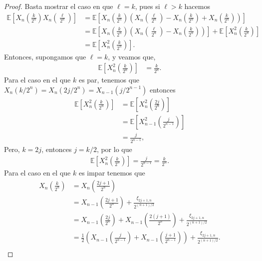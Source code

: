 \begin{proof}
Basta mostrar el caso en que $\ell = k$, pues si $\ell > k$ hacemos
	\begin{align*}
		\mathbb{E} \left[ X_n \left( \frac{k}{2^n} \right) X_n \left( \frac{\ell}{2^n} \right) \right] & = \mathbb{E} \left[ X_n \left( \frac{k}{2^n} \right) \left( X_n \left( \frac{\ell}{2^n} \right)  - X_n \left( \frac{k}{2^n} \right) + X_n \left( \frac{k}{2^n} \right) \right) \right] \\
        & = \mathbb{E} \left[ X_n \left( \frac{k}{2^n} \right) \left( X_n \left( \frac{\ell}{2^n} \right)  - X_n \left( \frac{k}{2^n} \right) \right) \right] + \mathbb{E} \left[ X^2_n \left( \frac{k}{2^n} \right) \right] \\
        & = \mathbb{E} \left[ X^2_n \left( \frac{k}{2^n} \right) \right].
	\end{align*}
Entonces, supongamos que $\ell = k$, y veamos que,
	\begin{align*}
		\mathbb{E} \left[ X_n^2 \left( \frac{k}{2^n} \right) \right] & = \frac{k}{2^n}.
	\end{align*}
Para el caso en el que $k$ es par, tenemos que $X_n (k / 2^n) = X_n (2j / 2^n) = X_{n-1} (j / 2^{n-1})$ entonces
	\begin{align*}
		\mathbb{E} \left[ X_n^2 \left( \frac{k}{2^n} \right) \right] & = \mathbb{E} \left[ X_n^2 \left( \frac{2j}{2^n} \right) \right] \\
		& = \mathbb{E} \left[ X_{n-1}^2 \left( \frac{j}{2^{n-1}} \right) \right] \\
		& = \frac{j}{2^{n-1}},
	\end{align*}
Pero, $k = 2j$, entonces $j = k/2$, por lo que 
	\begin{align*}
		\mathbb{E} \left[ X_n^2 \left( \frac{k}{2^n} \right) \right] = \frac{j}{2^{n-1}} = \frac{k}{2^n}.
	\end{align*}
Para el caso en el que $k$ es impar tenemos que
	\begin{align*}
		X_n \left( \frac{k}{2^n} \right) & = X_n \left( \frac{2j + 1}{2^n} \right) \\
		& = X_{n-1} \left( \frac{2j + 1}{2^n} \right) + \frac{\xi_{2j+1, n}}{2^{(n+1)/2}} \\
		& = X_{n-1} \left( \frac{2j}{2^n} \right) + X_{n-1} \left( \frac{2(j + 1)}{2^n} \right) + \frac{\xi_{2j+1, n}}{2^{(n+1)/2}} \\
		& = \frac{1}{2} \left( X_{n-1} \left( \frac{j}{2^{n-1}} \right) + X_{n-1} \left( \frac{j + 1}{2^{n-1}} \right) \right) + \frac{\xi_{2j+1, n}}{2^{(n+1)/2}}. \\

\end{align*}
\end{proof}
